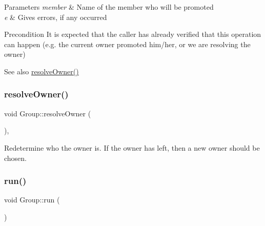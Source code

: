 \begin{DoxyParams}{Parameters}
{\em member} & Name of the member who will be promoted \\
\hline
{\em e} & Gives errors, if any occurred\\
\hline
\end{DoxyParams}
\begin{DoxyPrecond}{Precondition}
It is expected that the caller has already verified that this operation can happen (e.\+g. the current owner promoted him/her, or we are resolving the owner) 
\end{DoxyPrecond}
\begin{DoxySeeAlso}{See also}
\hyperlink{classshaan97_1_1sync_1_1_group_a4925f72201a7c780581220aa404fdab9}{resolve\+Owner()} 
\end{DoxySeeAlso}
\mbox{\label{classshaan97_1_1sync_1_1_group_a4925f72201a7c780581220aa404fdab9}} 
\subsubsection{\texorpdfstring{resolve\+Owner()}{resolveOwner()}}
{\footnotesize\ttfamily void Group\+::resolve\+Owner (\begin{DoxyParamCaption}{ }\end{DoxyParamCaption})\hspace{0.3cm}{\ttfamily [inline]}, {\ttfamily [private]}}



Redetermine who the owner is. If the owner has left, then a new owner should be chosen. 

\mbox{\label{classshaan97_1_1sync_1_1_group_a916b46aaf2fecb3694089a83850f061a}} 
\subsubsection{\texorpdfstring{run()}{run()}}
{\footnotesize\ttfamily void Group\+::run (\begin{DoxyParamCaption}{ }\end{DoxyParamCaption})\hspace{0.3cm}{\ttfamily [private]}}

